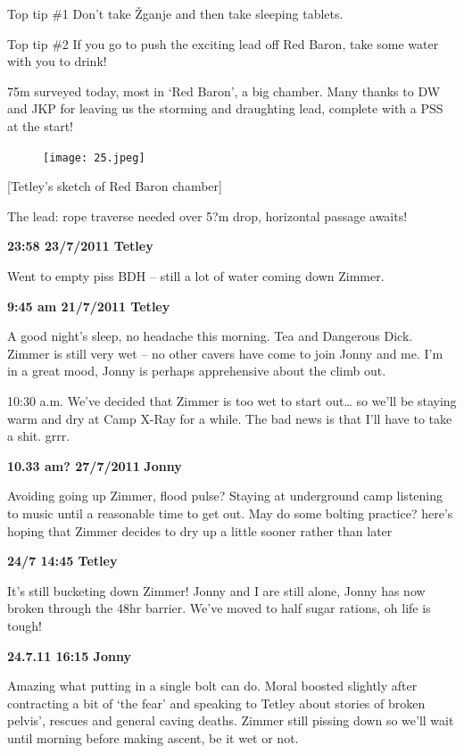 Top tip \#1 Don't take Žganje and then take sleeping tablets.

Top tip \#2 If you go to push the exciting lead off Red Baron, take some
water with you to drink!

75m surveyed today, most in `Red Baron', a big chamber. Many thanks to
DW and JKP for leaving us the storming and draughting lead, complete
with a PSS at the start!

\begin{figure}[htbp]
\centering
\texttt{[image: 25.jpeg]}
\caption{}
\end{figure}

{[}Tetley's sketch of Red Baron chamber{]}

The lead: rope traverse needed over 5?m drop, horizontal passage awaits!

\textbf{23:58 23/7/2011 Tetley}

Went to empty piss BDH -- still a lot of water coming down Zimmer.

\textbf{9:45 am 21/7/2011 Tetley}

A good night's sleep, no headache this morning. Tea and Dangerous Dick.
Zimmer is still very wet -- no other cavers have come to join Jonny and
me. I'm in a great mood, Jonny is perhaps apprehensive about the climb
out.

10:30 a.m. We've decided that Zimmer is too wet to start out\ldots{} so
we'll be staying warm and dry at Camp X-Ray for a while. The bad news is
that I'll have to take a shit. grrr.

\textbf{10.33 am? 27/7/2011} \textbf{Jonny}

Avoiding going up Zimmer, flood pulse? Staying at underground camp
listening to music until a reasonable time to get out. May do some
bolting practice? here's hoping that Zimmer decides to dry up a little
sooner rather than later

\textbf{24/7 14:45 Tetley}

It's still bucketing down Zimmer! Jonny and I are still alone, Jonny has
now broken through the 48hr barrier. We've moved to half sugar rations,
oh life is tough!

\textbf{24.7.11 16:15 Jonny}

Amazing what putting in a single bolt can do. Moral boosted slightly
after contracting a bit of `the fear' and speaking to Tetley about
stories of broken pelvis', rescues and general caving deaths. Zimmer
still pissing down so we'll wait until morning before making ascent, be
it wet or not.

